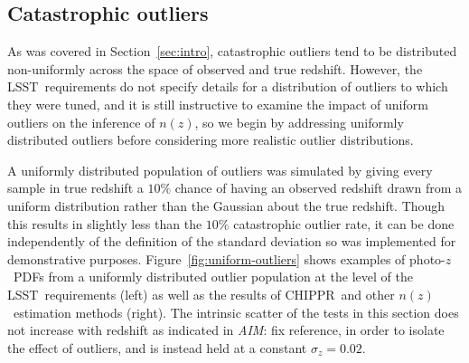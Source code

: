 \documentclass[iop]{emulateapj}
\newcommand{\todo}[3]{{\color{#2}\emph{#1}: #3}}
\newcommand{\aim}[1]{\todo{AIM}{red}{#1}}
\newcommand{\Sect}[1]{Section~\ref{#1}}
\newcommand{\Fig}[1]{Figure~\ref{#1}}
\newcommand{\project}[1]{{\textsc{#1}}}
\newcommand{\lsst}{\project{LSST}}
\newcommand{\Chippr}{\project{CHIPPR}}
\newcommand{\nz}{$n(z)$}
\newcommand{\pz}{photo-$z$~}
\newcommand{\pzpdf}{\pz PDF}
\begin{document}
\subsection{Catastrophic outliers}
\label{sec:outliers}

As was covered in \Sect{sec:intro}, catastrophic outliers tend to be distributed non-uniformly across the space of observed and true redshift.
However, the \lsst\ requirements do not specify details for a distribution of outliers to which they were tuned, and it is still instructive to examine the impact of uniform outliers on the inference of \nz, so we begin by addressing uniformly distributed outliers before considering more realistic outlier distributions.

A uniformly distributed population of outliers was simulated by giving every sample in true redshift a $10\%$ chance of having an observed redshift drawn from a uniform distribution rather than the Gaussian about the true redshift.
Though this results in slightly less than the $10\%$ catastrophic outlier rate, it can be done independently of the definition of the standard deviation so was implemented for demonstrative purposes.
\Fig{fig:uniform-outliers} shows examples of \pzpdf s from a uniformly distributed outlier population at the level of the \lsst\ requirements (left) as well as the results of \Chippr\ and other \nz\ estimation methods (right).
The intrinsic scatter of the tests in this section does not increase with redshift as indicated in \aim{fix reference},
in order to isolate the effect of outliers, and is instead held at a constant $\sigma_{z} = 0.02$.
\end{document}
